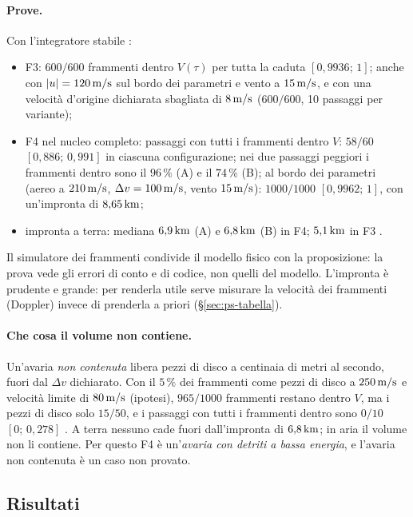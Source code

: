 \paragraph{Prove.} Con l'integratore stabile :
\begin{itemize}
\item F3: $600/600$ frammenti dentro $V(\tau)$ per tutta la caduta $[0{,}9936;\,1]$; anche con $|u|=120\,\mathrm{m/s}$ sul bordo dei parametri e vento a $15\,\mathrm{m/s}$, e con una velocità d'origine dichiarata sbagliata di $8\,\mathrm{m/s}$ ($600/600$, 10 passaggi per variante);
\item F4 nel nucleo completo: passaggi con tutti i frammenti dentro $V$: $58/60$ $[0{,}886;\,0{,}991]$ in ciascuna configurazione; nei due passaggi peggiori i frammenti dentro sono il $96\,\%$ (A) e il $74\,\%$ (B); al bordo dei parametri (aereo a $210\,\mathrm{m/s}$, $\Delta v=100\,\mathrm{m/s}$, vento $15\,\mathrm{m/s}$): $1000/1000$ $[0{,}9962;\,1]$, con un'impronta di $8{,}65\,\mathrm{km}$;
\item impronta a terra: mediana $6{,}9\,\mathrm{km}$ (A) e $6{,}8\,\mathrm{km}$ (B) in F4; $5{,}1\,\mathrm{km}$ in F3 .
\end{itemize}
Il simulatore dei frammenti condivide il modello fisico con la proposizione: la prova vede gli errori di conto e di codice, non quelli del modello. L'impronta è prudente e grande: per renderla utile serve misurare la velocità dei frammenti (Doppler) invece di prenderla a priori (\S\ref{sec:ps-tabella}).

\paragraph{Che cosa il volume non contiene.} Un'avaria \emph{non contenuta} libera pezzi di disco a centinaia di metri al secondo, fuori dal $\Delta v$ dichiarato. Con il $5\,\%$ dei frammenti come pezzi di disco a $250\,\mathrm{m/s}$ e velocità limite di $80\,\mathrm{m/s}$ (ipotesi), $965/1000$ frammenti restano dentro $V$, ma i pezzi di disco solo $15/50$, e i passaggi con tutti i frammenti dentro sono $0/10$ $[0;\,0{,}278]$ . A terra nessuno cade fuori dall'impronta di $6{,}8\,\mathrm{km}$; in aria il volume non li contiene. Per questo F4 è un'\emph{avaria con detriti a bassa energia}, e l'avaria non contenuta è un caso non provato.

\subsection{Risultati}\label{sec:vo-risultati}

